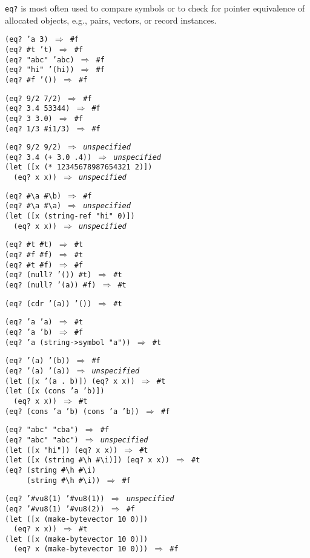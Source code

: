 \texttt{eq?} is most often used to compare symbols or to check for
pointer equivalence of allocated objects, e.g., pairs, vectors,
or record instances.

\begin{alltt}
(eq? 'a 3) \(\Rightarrow\) \#{}f
(eq? \#{}t 't) \(\Rightarrow\) \#{}f
(eq? "abc" 'abc) \(\Rightarrow\) \#{}f
(eq? "hi" '(hi)) \(\Rightarrow\) \#{}f
(eq? \#{}f '()) \(\Rightarrow\) \#{}f

(eq? 9/2 7/2) \(\Rightarrow\) \#{}f
(eq? 3.4 53344) \(\Rightarrow\) \#{}f
(eq? 3 3.0) \(\Rightarrow\) \#{}f
(eq? 1/3 \#{}i1/3) \(\Rightarrow\) \#{}f

(eq? 9/2 9/2) \(\Rightarrow\) \textit{unspecified}
(eq? 3.4 (+ 3.0 .4)) \(\Rightarrow\) \textit{unspecified}
(let ([x (* 12345678987654321 2)])
  (eq? x x)) \(\Rightarrow\) \textit{unspecified}

(eq? \#{}\textbackslash{}a \#{}\textbackslash{}b) \(\Rightarrow\) \#{}f
(eq? \#{}\textbackslash{}a \#{}\textbackslash{}a) \(\Rightarrow\) \textit{unspecified}
(let ([x (string-ref "hi" 0)])
  (eq? x x)) \(\Rightarrow\) \textit{unspecified}

(eq? \#{}t \#{}t) \(\Rightarrow\) \#{}t
(eq? \#{}f \#{}f) \(\Rightarrow\) \#{}t
(eq? \#{}t \#{}f) \(\Rightarrow\) \#{}f
(eq? (null? '()) \#{}t) \(\Rightarrow\) \#{}t
(eq? (null? '(a)) \#{}f) \(\Rightarrow\) \#{}t

(eq? (cdr '(a)) '()) \(\Rightarrow\) \#{}t

(eq? 'a 'a) \(\Rightarrow\) \#{}t
(eq? 'a 'b) \(\Rightarrow\) \#{}f
(eq? 'a (string-\textgreater{}symbol "a")) \(\Rightarrow\) \#{}t

(eq? '(a) '(b)) \(\Rightarrow\) \#{}f
(eq? '(a) '(a)) \(\Rightarrow\) \textit{unspecified}
(let ([x '(a . b)]) (eq? x x)) \(\Rightarrow\) \#{}t
(let ([x (cons 'a 'b)])
  (eq? x x)) \(\Rightarrow\) \#{}t
(eq? (cons 'a 'b) (cons 'a 'b)) \(\Rightarrow\) \#{}f

(eq? "abc" "cba") \(\Rightarrow\) \#{}f
(eq? "abc" "abc") \(\Rightarrow\) \textit{unspecified}
(let ([x "hi"]) (eq? x x)) \(\Rightarrow\) \#{}t
(let ([x (string \#{}\textbackslash{}h \#{}\textbackslash{}i)]) (eq? x x)) \(\Rightarrow\) \#{}t
(eq? (string \#{}\textbackslash{}h \#{}\textbackslash{}i)
     (string \#{}\textbackslash{}h \#{}\textbackslash{}i)) \(\Rightarrow\) \#{}f

(eq? '\#{}vu8(1) '\#{}vu8(1)) \(\Rightarrow\) \textit{unspecified}
(eq? '\#{}vu8(1) '\#{}vu8(2)) \(\Rightarrow\) \#{}f
(let ([x (make-bytevector 10 0)])
  (eq? x x)) \(\Rightarrow\) \#{}t
(let ([x (make-bytevector 10 0)])
  (eq? x (make-bytevector 10 0))) \(\Rightarrow\) \#{}f


\end{alltt}
